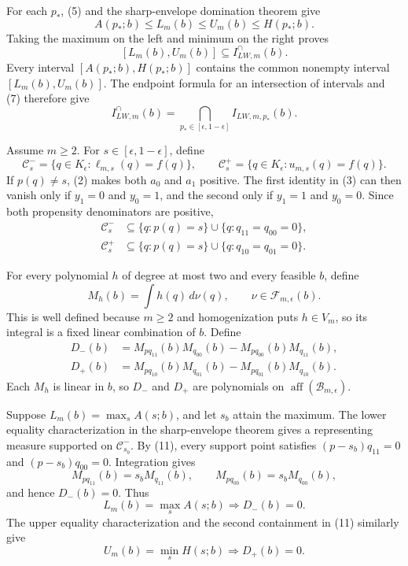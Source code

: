 For each \(p_*\), (5) and the sharp-envelope domination theorem give
\[
 A(p_*;b)\leq L_m(b)\leq U_m(b)\leq H(p_*;b).
\tag{8}
\]
Taking the maximum on the left and minimum on the right proves
\[
 [L_m(b),U_m(b)]\subseteq I_{LW,m}^{\cap}(b).
\tag{9}
\]
Every interval \([A(p_*;b),H(p_*;b)]\) contains the common nonempty interval \([L_m(b),U_m(b)]\).  The endpoint formula for an intersection of intervals and (7) therefore give
\[
 I_{LW,m}^{\cap}(b)
 =\bigcap_{p_*\in[\epsilon,1-\epsilon]}I_{LW,m,p_*}(b).
\tag{10}
\]

Assume \(m\geq2\).  For \(s\in[\epsilon,1-\epsilon]\), define
\[
 \mathcal C_s^-=\{q\in K_{\epsilon}:\ell_{m,s}(q)=f(q)\},
 \qquad
 \mathcal C_s^+=\{q\in K_{\epsilon}:u_{m,s}(q)=f(q)\}.
\]
If \(p(q)\neq s\), (2) makes both \(a_0\) and \(a_1\) positive.  The first identity in (3) can then vanish only if \(y_1=0\) and \(y_0=1\), and the second only if \(y_1=1\) and \(y_0=0\).  Since both propensity denominators are positive,
\[
 \begin{aligned}
 \mathcal C_s^-&\subseteq\{q:p(q)=s\}\cup\{q:q_{11}=q_{00}=0\},\\
 \mathcal C_s^+&\subseteq\{q:p(q)=s\}\cup\{q:q_{10}=q_{01}=0\}.
 \end{aligned}
\tag{11}
\]

For every polynomial \(h\) of degree at most two and every feasible \(b\), define
\[
 M_h(b)=\int h(q)\,d\nu(q),\qquad \nu\in\mathcal F_{m,\epsilon}(b).
\]
This is well defined because \(m\geq2\) and homogenization puts \(h\in V_m\), so its integral is a fixed linear combination of \(b\).  Define
\[
 \begin{aligned}
 D_-(b)&=M_{p q_{11}}(b)M_{q_{00}}(b)-M_{p q_{00}}(b)M_{q_{11}}(b),\\
 D_+(b)&=M_{p q_{10}}(b)M_{q_{01}}(b)-M_{p q_{01}}(b)M_{q_{10}}(b).
 \end{aligned}
\tag{12}
\]
Each \(M_h\) is linear in \(b\), so \(D_-\) and \(D_+\) are polynomials on \(\operatorname{aff}(\mathcal B_{m,\epsilon})\).

Suppose \(L_m(b)=\max_sA(s;b)\), and let \(s_b\) attain the maximum.  The lower equality characterization in the sharp-envelope theorem gives a representing measure supported on \(\mathcal C_{s_b}^-\).  By (11), every support point satisfies \((p-s_b)q_{11}=0\) and \((p-s_b)q_{00}=0\).  Integration gives
\[
 M_{p q_{11}}(b)=s_bM_{q_{11}}(b),
 \qquad M_{p q_{00}}(b)=s_bM_{q_{00}}(b),
\]
and hence \(D_-(b)=0\).  Thus
\[
 L_m(b)=\max_sA(s;b)\Longrightarrow D_-(b)=0.
\tag{13}
\]
The upper equality characterization and the second containment in (11) similarly give
\[
 U_m(b)=\min_sH(s;b)\Longrightarrow D_+(b)=0.
\tag{14}
\]

